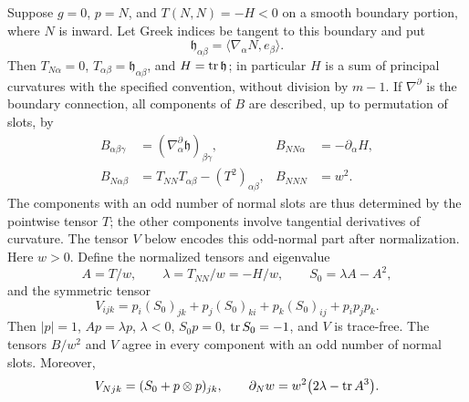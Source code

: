 \begin{proposition}\label{geo:boundary-jets}
Suppose $g=0$, $p=N$, and $T(N,N)=-H<0$ on a smooth boundary portion,
where $N$ is inward. Let Greek indices be tangent to this boundary and
put
\[
 \mathfrak h_{\alpha\beta}
 =\langle\nabla_{\alpha}N,e_\beta\rangle.
\]
Then $T_{N\alpha}=0$, $T_{\alpha\beta}=\mathfrak h_{\alpha\beta}$,
and $H=\operatorname{tr}\mathfrak h$; in particular $H$ is a sum of principal
curvatures with the specified convention, without division by $m-1$.
If $\nabla^{\partial}$ is the boundary connection, all components of
$B$ are described, up to permutation of slots, by
\begin{align}
 B_{\alpha\beta\gamma}
   &=(\nabla^{\partial}_{\alpha}\mathfrak h)_{\beta\gamma},
 &B_{NN\alpha}&=-\partial_\alpha H,
 \label{geo:even-boundary-jets}\\
 B_{N\alpha\beta}
   &=T_{NN}T_{\alpha\beta}-(T^2)_{\alpha\beta},
 &B_{NNN}&=w^2.
 \label{geo:odd-boundary-jets}
\end{align}
The components with an odd number of normal slots are thus determined
by the pointwise tensor $T$; the other components involve tangential
derivatives of curvature. The tensor $V$ below encodes this odd-normal
part after normalization.
Here $w>0$. Define the normalized tensors and eigenvalue
\[
 A=T/w,\qquad \lambda=T_{NN}/w=-H/w,
 \qquad S_0=\lambda A-A^2,
\]
and the symmetric tensor
\begin{equation}\label{geo:boundary-V}
 V_{ijk}=p_i(S_0)_{jk}+p_j(S_0)_{ki}+p_k(S_0)_{ij}
           +p_ip_jp_k.
\end{equation}
Then $|p|=1$, $Ap=\lambda p$, $\lambda<0$, $S_0p=0$,
$\operatorname{tr} S_0=-1$, and $V$ is trace-free. The tensors $B/w^2$ and $V$
agree in every component with an odd number of normal slots. Moreover,
\begin{equation}\label{geo:normal-w}
 V_{Njk}=(S_0+p\otimes p)_{jk},\qquad
 \partial_N w=w^2\bigl(2\lambda-\operatorname{tr} A^3\bigr).
\end{equation}
\end{proposition}

